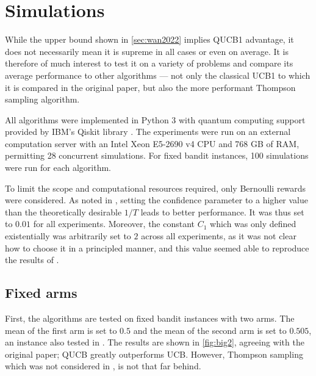 \chapter{Simulations}
\label{sec:simulations}

While the upper bound shown in \cref{sec:wan2022} implies QUCB1 advantage, it does not necessarily mean it is supreme in all cases or even on average.
It is therefore of much interest to test it on a variety of problems and compare its average performance to other algorithms — not only the classical UCB1 to which it is compared in the original paper, but also the more performant Thompson sampling algorithm.

All algorithms were implemented in Python 3 \autocite{python} with quantum computing support provided by IBM's Qiskit library \autocite{qiskit}.
The experiments were run on an external computation server with an Intel Xeon E5-2690 v4 CPU and 768 GB of RAM, permitting 28 concurrent simulations.
For fixed bandit instances, 100 simulations were run for each algorithm.

To limit the scope and computational resources required, only Bernoulli rewards were considered.
As noted in \autocite{wan2022}, setting the confidence parameter to a higher value than the theoretically desirable $1/T$ leads to better performance.
It was thus set to $0.01$ for all experiments.
Moreover, the constant $C_1$ which was only defined existentially was arbitrarily set to $2$ across all experiments, as it was not clear how to choose it in a principled manner, and this value seemed able to reproduce the results of \autocite{wan2022}.

\section{Fixed arms}
\label{sec:sim_fixed_arms}
First, the algorithms are tested on fixed bandit instances with two arms.
The mean of the first arm is set to $0.5$ and the mean of the second arm is set to $0.505$, an instance also tested in \autocite{wan2022}.
The results are shown in \cref{fig:big2}, agreeing with the original paper; QUCB greatly outperforms UCB.
However, Thompson sampling which was not considered in \autocite{wan2022}, is not that far behind.

